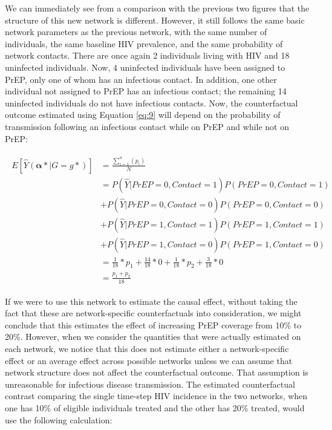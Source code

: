 \documentclass{article}
\theoremstyle{definition}
\begin{document}
We can immediately see from a comparison with the previous two figures that the structure of this new network is different. However, it still follows the same basic network parameters as the previous network, with the same number of individuals, the same baseline HIV prevalence, and the same probability of network contacts. There are once again 2 individuals living with HIV and 18 uninfected individuals. Now, 4 uninfected individuals have been assigned to PrEP, only one of whom has an infectious contact. In addition, one other individual not assigned to PrEP has an infectious contact; the remaining 14 uninfected individuals do not have infectious contacts. Now, the counterfactual outcome estimated using Equation \ref{eq:9} will depend on the probability of transmission following an infectious contact while on PrEP and while not on PrEP:

\begin{align}
\begin{split}
E[\hat{Y}\left(\mathbf{\alpha*}|G=g*\right)] & = \frac{\sum_{i=1}^{n}(p_{i})}{N}  \\ 
& = P\left(\hat{Y}|PrEP = 0, Contact = 1\right)P\left(PrEP = 0, Contact = 1\right)  \\ \nonumber
& +P\left(\hat{Y}|PrEP = 0, Contact = 0\right)P\left(PrEP = 0, Contact = 0\right)  \\ \nonumber
& +P\left(\hat{Y}|PrEP = 1, Contact = 1\right)P\left(PrEP = 1, Contact = 1\right) \\ \nonumber
& +P\left(\hat{Y}|PrEP = 1, Contact = 0\right)P\left(PrEP = 1, Contact = 0\right) \\ \nonumber
 &= \frac{1}{18}*p_1 +  \frac{14}{18}*0 +\frac{1}{18}*p_2 +  \frac{3}{18}*0 \\ \nonumber
 &=\frac{p_1+p_2}{18}  \nonumber
 \end{split}
\end{align}

If we were to use this network to estimate the causal effect, without taking the fact that these are network-specific counterfactuals into consideration, we might conclude that this estimates the effect of increasing PrEP coverage from 10\% to 20\%. However, when we consider the quantities that were actually estimated on each network, we notice that this does not estimate either a network-specific effect or an average effect across possible networks unless we can assume that network structure does not affect the counterfactual outcome. That assumption is unreasonable for infectious disease transmission. The estimated counterfactual contrast comparing the single time-step HIV incidence in the two networks, when one has 10\% of eligible individuals treated and the other has 20\% treated, would use the following calculation: 
\end{document}
